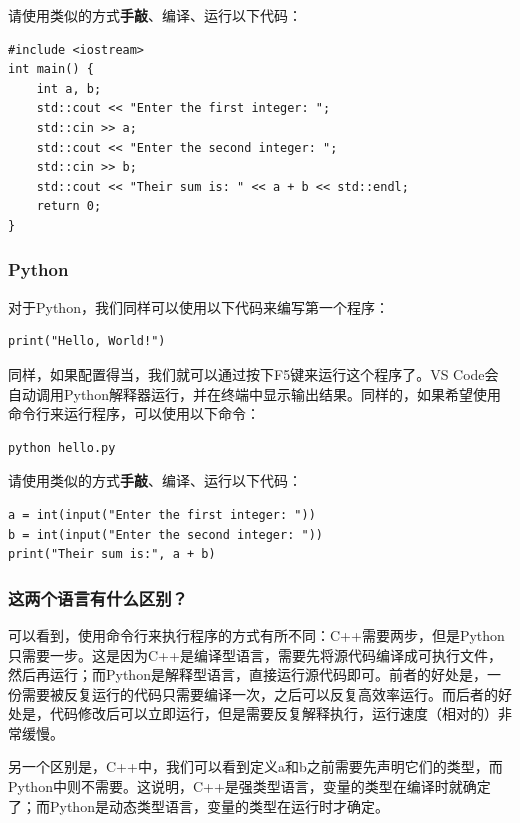 \documentclass[../main.tex]{subfiles}
\begin{document}
请使用类似的方式\textbf{手敲}、编译、运行以下代码：

\begin{verbatim}
#include <iostream>
int main() {
    int a, b;
    std::cout << "Enter the first integer: ";
    std::cin >> a;
    std::cout << "Enter the second integer: ";
    std::cin >> b;
    std::cout << "Their sum is: " << a + b << std::endl;
    return 0;
}
\end{verbatim}

\subsubsection{Python}

对于Python，我们同样可以使用以下代码来编写第一个程序：

\begin{verbatim}
print("Hello, World!")
\end{verbatim}

同样，如果配置得当，我们就可以通过按下F5键来运行这个程序了。VS Code会自动调用Python解释器运行，并在终端中显示输出结果。同样的，如果希望使用命令行来运行程序，可以使用以下命令：

\begin{verbatim}
python hello.py
\end{verbatim}

请使用类似的方式\textbf{手敲}、编译、运行以下代码：

\begin{verbatim}
a = int(input("Enter the first integer: "))
b = int(input("Enter the second integer: "))
print("Their sum is:", a + b)
\end{verbatim}

\subsubsection{这两个语言有什么区别？}

可以看到，使用命令行来执行程序的方式有所不同：C++需要两步，但是Python只需要一步。这是因为C++是编译型语言，需要先将源代码编译成可执行文件，然后再运行；而Python是解释型语言，直接运行源代码即可。前者的好处是，一份需要被反复运行的代码只需要编译一次，之后可以反复高效率运行。而后者的好处是，代码修改后可以立即运行，但是需要反复解释执行，运行速度（相对的）非常缓慢。

另一个区别是，C++中，我们可以看到定义a和b之前需要先声明它们的类型，而Python中则不需要。这说明，C++是强类型语言，变量的类型在编译时就确定了；而Python是动态类型语言，变量的类型在运行时才确定。
\end{document}
